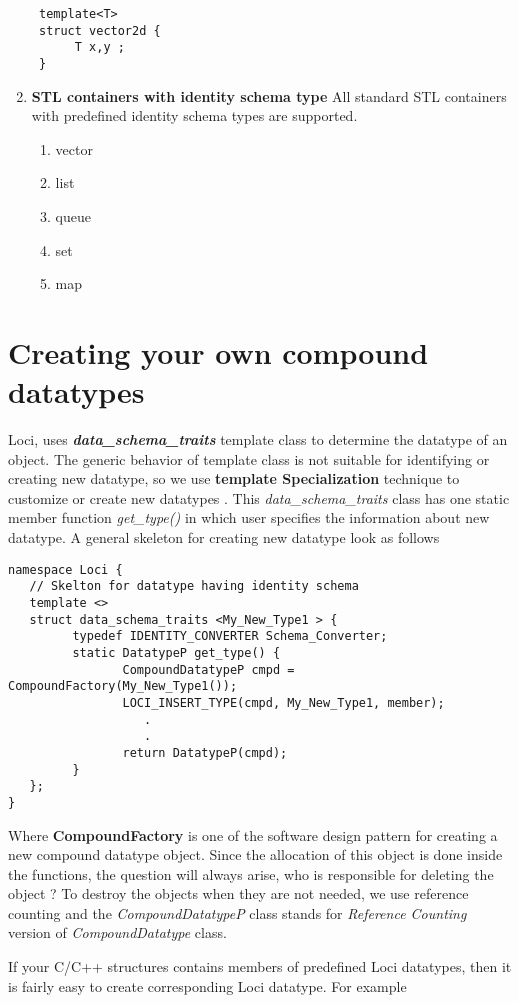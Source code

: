 \begin{enumerate}
\begin{verbatim}
 template<T>
 struct vector2d {
      T x,y ;
 }
\end{verbatim}
\item {\bf STL containers with identity schema type}
All standard STL containers with predefined identity schema types are supported.
\begin{enumerate}
\item vector
\item list
\item queue
\item set
\item map
\end{enumerate}
\end{enumerate}
\section {Creating your own compound datatypes}
%
Loci, uses {\bf \em data\_schema\_traits} template class to determine the datatype of 
an object. The generic behavior of template class is not suitable for identifying 
or creating new datatype, so we use {\bf template Specialization }
technique to customize or create new datatypes . This {\em
data\_schema\_traits} class has one static member function {\em get\_type()} 
in which user specifies the information about new
datatype. A general skeleton for creating new datatype look as follows
\begin{verbatim}
namespace Loci {
   // Skelton for datatype having identity schema
   template <>
   struct data_schema_traits <My_New_Type1 > {
         typedef IDENTITY_CONVERTER Schema_Converter;
         static DatatypeP get_type() {
                CompoundDatatypeP cmpd = CompoundFactory(My_New_Type1());
                LOCI_INSERT_TYPE(cmpd, My_New_Type1, member);
                   .
                   .
                return DatatypeP(cmpd);
         }
   };
}
\end{verbatim}
%
Where {\bf CompoundFactory} is one of the software design pattern for creating a 
new compound datatype object. Since the allocation of this object is done inside
the functions, the question will always arise, who is responsible for deleting
the object ? To destroy the objects when they are not needed, we use reference counting and the 
{\em CompoundDatatypeP} class stands for {\em Reference Counting} version of
{\em CompoundDatatype} class.
%
\par If your C/C++ structures contains members of predefined Loci datatypes, then it
is fairly easy to create corresponding Loci datatype. For example
